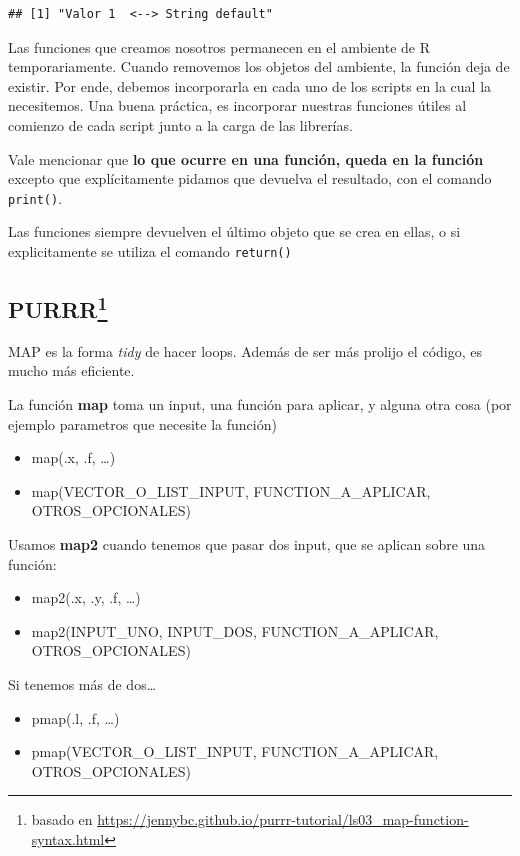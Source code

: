 \documentclass[]{book}
\providecommand{\tightlist}{%
  \setlength{\itemsep}{0pt}\setlength{\parskip}{0pt}}
\let\rmarkdownfootnote\footnote%
\def\footnote{\protect\rmarkdownfootnote}
\begin{document}
\begin{verbatim}
## [1] "Valor 1  <--> String default"
\end{verbatim}

Las funciones que creamos nosotros permanecen en el ambiente de R temporariamente. Cuando removemos los objetos del ambiente, la función deja de existir. Por ende, debemos incorporarla en cada uno de los scripts en la cual la necesitemos. Una buena práctica, es incorporar nuestras funciones útiles al comienzo de cada script junto a la carga de las librerías.

Vale mencionar que \textbf{lo que ocurre en una función, queda en la función} excepto que explícitamente pidamos que devuelva el resultado, con el comando \texttt{print()}.

Las funciones siempre devuelven el último objeto que se crea en ellas, o si explicitamente se utiliza el comando \texttt{return()}

\hypertarget{purrr}{%
\subsection[PURRR]{\texorpdfstring{PURRR\footnote{basado en \url{https://jennybc.github.io/purrr-tutorial/ls03_map-function-syntax.html}}}{PURRR}}\label{purrr}}

MAP es la forma \emph{tidy} de hacer loops. Además de ser más prolijo el código, es mucho más eficiente.

La función \textbf{map} toma un input, una función para aplicar, y alguna otra cosa (por ejemplo parametros que necesite la función)

\begin{itemize}
\tightlist
\item
  map(.x, .f, \ldots{})
\item
  map(VECTOR\_O\_LIST\_INPUT, FUNCTION\_A\_APLICAR, OTROS\_OPCIONALES)
\end{itemize}

Usamos \textbf{map2} cuando tenemos que pasar dos input, que se aplican sobre una función:

\begin{itemize}
\tightlist
\item
  map2(.x, .y, .f, \ldots{})
\item
  map2(INPUT\_UNO, INPUT\_DOS, FUNCTION\_A\_APLICAR, OTROS\_OPCIONALES)
\end{itemize}

Si tenemos más de dos\ldots{}

\begin{itemize}
\tightlist
\item
  pmap(.l, .f, \ldots{})
\item
  pmap(VECTOR\_O\_LIST\_INPUT, FUNCTION\_A\_APLICAR, OTROS\_OPCIONALES)
\end{itemize}
\end{document}
